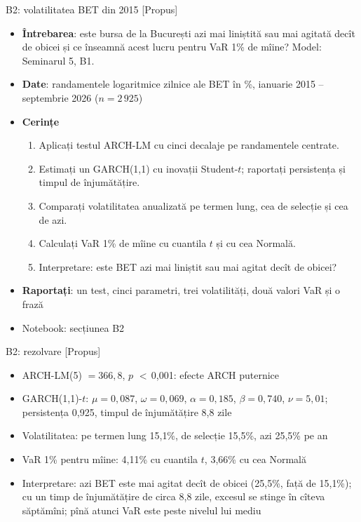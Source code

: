 \begin{frame}{B2: volatilitatea BET din 2015 [Propus]}
\itemsize{\footnotesize}
\begin{itemize}
\item \textbf{Întrebarea}: este bursa de la București azi mai liniștită sau mai agitată decît de obicei și ce înseamnă acest lucru pentru VaR 1\% de mîine? Model: Seminarul 5, B1.
\item \textbf{Date}: randamentele logaritmice zilnice ale BET în \%, ianuarie 2015 -- septembrie 2026 ($n = 2\,925$)
\item \textbf{Cerințe}
\begin{enumerate}
    \item Aplicați testul ARCH-LM cu cinci decalaje pe randamentele centrate.
    \item Estimați un GARCH(1,1) cu inovații Student-$t$; raportați persistența și timpul de înjumătățire.
    \item Comparați volatilitatea anualizată pe termen lung, cea de selecție și cea de azi.
    \item Calculați VaR 1\% de mîine cu cuantila $t$ și cu cea Normală.
    \item Interpretare: este BET azi mai liniștit sau mai agitat decît de obicei?
\end{enumerate}
\item \textbf{Raportați}: un test, cinci parametri, trei volatilități, două valori VaR și o frază
\item Notebook: secțiunea B2
\end{itemize}
\end{frame}

\ifsolutions
\begin{frame}{B2: rezolvare [Propus]}
\itemsize{\footnotesize}
\begin{itemize}
    \item ARCH-LM(5) $= 366{,}8$, $p$ $<$\,0{,}001: efecte ARCH puternice
    \item GARCH(1,1)-$t$: $\mu = 0{,}087$, $\omega = 0{,}069$, $\alpha = 0{,}185$, $\beta = 0{,}740$, $\nu = 5{,}01$; persistența 0{,}925, timpul de înjumătățire 8{,}8 zile
    \item Volatilitatea: pe termen lung 15{,}1\%, de selecție 15{,}5\%, azi 25{,}5\% pe an
    \item VaR 1\% pentru mîine: 4{,}11\% cu cuantila $t$, 3{,}66\% cu cea Normală
    \item Interpretare: azi BET este mai agitat decît de obicei (25{,}5\%, față de 15{,}1\%); cu un timp de înjumătățire de circa 8{,}8 zile, excesul se stinge în cîteva săptămîni; pînă atunci VaR este peste nivelul lui mediu
\end{itemize}
\end{frame}
\fi

